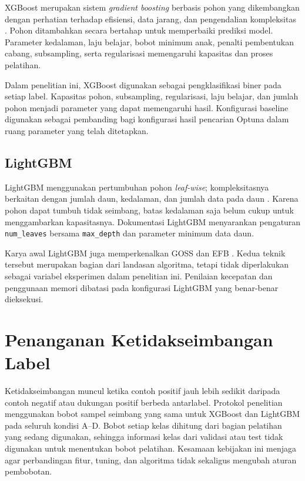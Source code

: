 XGBoost merupakan sistem \textit{gradient boosting} berbasis pohon yang dikembangkan dengan perhatian terhadap efisiensi, data jarang, dan pengendalian kompleksitas \cite{chen2016}. Pohon ditambahkan secara bertahap untuk memperbaiki prediksi model. Parameter kedalaman, laju belajar, bobot minimum anak, penalti pembentukan cabang, subsampling, serta regularisasi memengaruhi kapasitas dan proses pelatihan.

Dalam penelitian ini, XGBoost digunakan sebagai pengklasifikasi biner pada setiap label. Kapasitas pohon, subsampling, regularisasi, laju belajar, dan jumlah pohon menjadi parameter yang dapat memengaruhi hasil. Konfigurasi baseline digunakan sebagai pembanding bagi konfigurasi hasil pencarian Optuna dalam ruang parameter yang telah ditetapkan.

\subsection{LightGBM}

LightGBM menggunakan pertumbuhan pohon \textit{leaf-wise}; kompleksitasnya berkaitan dengan jumlah daun, kedalaman, dan jumlah data pada daun \cite{ke2017,lightgbmtuning2026}. Karena pohon dapat tumbuh tidak seimbang, batas kedalaman saja belum cukup untuk menggambarkan kapasitasnya. Dokumentasi LightGBM menyarankan pengaturan \texttt{num\_leaves} bersama \texttt{max\_depth} dan parameter minimum data daun.

Karya awal LightGBM juga memperkenalkan GOSS dan EFB \cite{ke2017}. Kedua teknik tersebut merupakan bagian dari landasan algoritma, tetapi tidak diperlakukan sebagai variabel eksperimen dalam penelitian ini. Penilaian kecepatan dan penggunaan memori dibatasi pada konfigurasi LightGBM yang benar-benar dieksekusi.

\section{Penanganan Ketidakseimbangan Label}

Ketidakseimbangan muncul ketika contoh positif jauh lebih sedikit daripada contoh negatif atau dukungan positif berbeda antarlabel. Protokol penelitian menggunakan bobot sampel seimbang yang sama untuk XGBoost dan LightGBM pada seluruh kondisi A--D. Bobot setiap kelas dihitung dari bagian pelatihan yang sedang digunakan, sehingga informasi kelas dari validasi atau test tidak digunakan untuk menentukan bobot pelatihan. Kesamaan kebijakan ini menjaga agar perbandingan fitur, tuning, dan algoritma tidak sekaligus mengubah aturan pembobotan.

